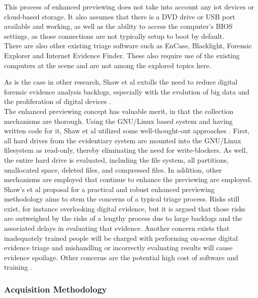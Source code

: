 \documentclass[12pt]{article}
\begin{document}
This process of enhanced previewing does not take into account any \gls{iot} devices or 
cloud-based storage. It also assumes that there is a DVD drive or USB port available and
working, as well as the ability to access the computer's BIOS settings, as those
connections are not typically setup to boot by default.\\

There are also other existing triage software such as EnCase, Blacklight, Forensic
Explorer and Internet Evidence Finder.  These also require use of the existing computers
at the scene and are not among the explored topics here.

As is the case in other research, Shaw et al extolls the need to reduce digital
forensic evidence analysis backlogs, especially with the evolution of big data and
the proliferation of digital devices \cite{shaw2013practical}.\\

The enhanced previewing concept has valuable merit, in that the collection mechanisms
are thorough.  Using the GNU/Linux based system and having written code for it, Shaw 
et al utilized some well-thought-out approaches \cite{shaw2013practical}.  First, all
hard drives from the evidentiary system are mounted into the GNU/Linux filesystem as
read-only, thereby eliminating the need for write-blockers.  As well, the entire hard
drive is evaluated, including the file system, all partitions, unallocated space,
deleted files, and compressed files.  In addition, other mechanisms are employed that
continue to enhance the previewing are employed.\\

Shaw's et al proposal for a practical and robust enhanced previewing methodology aims to stem
the concerns of a typical triage process.  Risks still exist, for instance overlooking
digital evidence, but it is argued that those risks are outweighed by the risks of a
lengthy process due to large backlogs and the associated delays in evaluating that
evidence.  Another concern exists that inadequately trained people will be charged
with performing on-scene digital evidence triage and mishandling or incorrectly
evaluating results will cause evidence spoilage. Other concerns are the potential high
cost of software and training \cite{shaw2013practical}.\\

\subsubsection{Acquisition Methodology}
\end{document}
